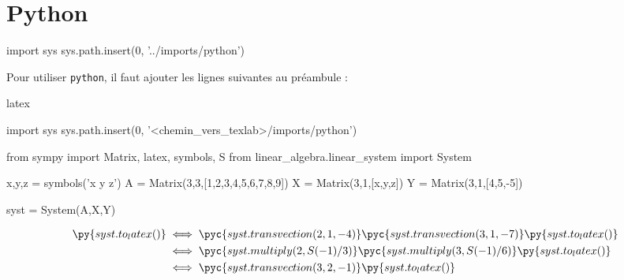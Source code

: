 
\section{Python}

    \begin{pycode}
import sys
sys.path.insert(0, '../imports/python')
    \end{pycode}

    Pour utiliser \verb|python|, il faut ajouter les lignes suivantes au préambule :

    \begin{code}{latex}
        
        \begin{pycode}
            import sys
            sys.path.insert(0, '<chemin_vers_texlab>/imports/python')
        \end{pycode}
    \end{code}

    \begin{latexcode}
\begin{pycode}
from sympy import Matrix, latex, symbols, S
from linear_algebra.linear_system import System

x,y,z = symbols('x y z')
A = Matrix(3,3,[1,2,3,4,5,6,7,8,9])
X = Matrix(3,1,[x,y,z])
Y = Matrix(3,1,[4,5,-5])

syst = System(A,X,Y)
\end{pycode}
        \begin{align*}
            \py{syst.to_latex()} & \iff \pyc{syst.transvection(2,1,-4)}
                \pyc{syst.transvection(3,1,-7)}
                \py{syst.to_latex()} \\
                                 & \iff \pyc{syst.multiply(2, S(-1)/3)}
                \pyc{syst.multiply(3,S(-1)/6)}
                \py{syst.to_latex()} \\
                                 & \iff \pyc{syst.transvection(3,2,-1)}
                \py{syst.to_latex()}
        \end{align*}
    \end{latexcode}

